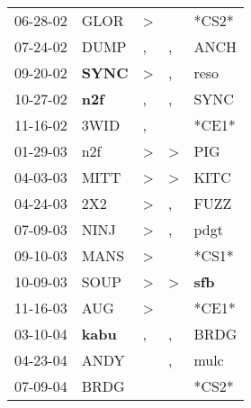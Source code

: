 \begin{supertabular}{p{0.07\textwidth}p{0.06\textwidth}p{0.02\textwidth}p{0.02\textwidth}p{0.06\textwidth}}
 06-28-02\textsuperscript{} &           GLOR\textsuperscript{} &     \textgreater &                  &                            *CS2* \\
 07-24-02\textsuperscript{} &           DUMP\textsuperscript{} &                , &                , &           ANCH\textsuperscript{} \\
 09-20-02\textsuperscript{} &  \textbf{SYNC\textsuperscript{}} &     \textgreater &                , &           reso\textsuperscript{} \\
 10-27-02\textsuperscript{} &   \textbf{n2f\textsuperscript{}} &                , &                , &           SYNC\textsuperscript{} \\
 11-16-02\textsuperscript{} &           3WID\textsuperscript{} &                , &                  &                            *CE1* \\
 01-29-03\textsuperscript{} &            n2f\textsuperscript{} &     \textgreater &     \textgreater &            PIG\textsuperscript{} \\
 04-03-03\textsuperscript{} &           MITT\textsuperscript{} &     \textgreater &     \textgreater &           KITC\textsuperscript{} \\
 04-24-03\textsuperscript{} &            2X2\textsuperscript{} &     \textgreater &                , &           FUZZ\textsuperscript{} \\
 07-09-03\textsuperscript{} &           NINJ\textsuperscript{} &     \textgreater &                , &           pdgt\textsuperscript{} \\
 09-10-03\textsuperscript{} &           MANS\textsuperscript{} &     \textgreater &                  &                            *CS1* \\
 10-09-03\textsuperscript{} &           SOUP\textsuperscript{} &     \textgreater &     \textgreater &   \textbf{sfb\textsuperscript{}} \\
 11-16-03\textsuperscript{} &            AUG\textsuperscript{} &     \textgreater &                  &                            *CE1* \\
 03-10-04\textsuperscript{} &  \textbf{kabu\textsuperscript{}} &                , &                , &           BRDG\textsuperscript{} \\
 04-23-04\textsuperscript{} &           ANDY\textsuperscript{} &                  &                , &           mulc\textsuperscript{} \\
 07-09-04\textsuperscript{} &           BRDG\textsuperscript{} &                  &                  &                            *CS2* \\

\end{supertabular}
